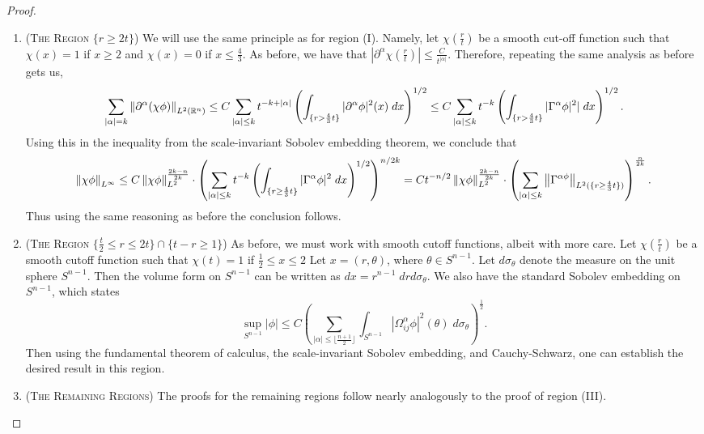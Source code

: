 \documentclass{article}
\begin{document}
\begin{proof}
\begin{enumerate}[itemsep =-2pt,label = (\Roman{*})]
		\item (\textsc{The Region $\{r \geq 2t\}$}) We will use the same principle as for region (I). Namely, let $\chi\left(\frac{r}{t}\right)$ be a smooth cut-off function such that $\chi(x) = 1$ if $x \geq 2$ and $\chi(x) = 0$ if $x \leq \frac{4}{3}$. As before, we have that $|\partial^{\alpha}\chi\left(\frac{r}{t}\right)| \leq \frac{C}{t^{|\alpha|}}$. Therefore, repeating the same analysis as before gets us, 
		\begin{equation*}
			\sum_{|\alpha| = k}\left\Vert \partial^{\alpha}(\chi\phi) \right\Vert_{L^{2}(\mathbb{R}^{n})} \leq C \sum_{|\alpha|\leq k}	t^{-k + |\alpha|}\left(\int_{\{r > \frac{4}{3}t\}}|\partial^{\alpha}\phi|^{2}(x)\;dx\right)^{1/2} \leq C\sum_{|\alpha|\leq k}t^{-k}\left(\int_{\{r > \frac{4}{3}t\}}|\Gamma^{\alpha}\phi|^{2}|\;dx\right)^{1/2}. 
		\end{equation*}
		Using this in the inequality from the scale-invariant Sobolev embedding theorem, we conclude that 
		\begin{equation*}
			\left\Vert \chi\phi \right\Vert_{L^{\infty}} \leq C \left\Vert \chi\phi \right\Vert_{L^{2}}^{\frac{2k -n}{2k}} \cdot \left(\sum_{|\alpha| \leq k}t^{-k}\left(\int_{\{r \geq  \frac{4}{3}t\}}|\Gamma^{\alpha}\phi|^{2}\;dx\right)^{1/2}\right)^{n/2k} = Ct^{-n/2}\left\Vert \chi\phi \right\Vert_{L^{2}}^{\frac{2k - n}{2k}} \cdot \left(\sum_{|\alpha|\leq k}\left\Vert \Gamma^{\alpha\phi} \right\Vert_{L^{2}(\{r \geq \frac{4}{3}t\})}\right)^{\frac{n}{2k}}. 
		\end{equation*} 
		Thus using the same reasoning as before the conclusion follows. 
		\item (\textsc{The Region $\{\frac{t}{2} \leq r \leq 2t\} \cap \{t - r \geq 1\}$}) As before, we must work with smooth cutoff functions, albeit with more care. Let $\chi\left(\frac{r}{t}\right)$ be a smooth cutoff function such that $\chi(t) = 1$ if $\frac{1}{2}\leq x \leq 2$ Let $x = (r,\theta)$, where $\theta \in S^{n-1}$. Let $d\sigma_{\theta}$ denote the measure on the unit sphere $S^{n-1}$. Then the volume form on $S^{n-1}$ can be written as $dx = r^{n-1}\;drd\sigma_{\theta}$. We also have the standard Sobolev embedding on $S^{n-1}$, which states 
		\begin{equation*}
			\sup_{S^{n-1}}|\phi|\leq C\left(\sum_{|\alpha|\leq \lfloor \frac{n + 1}{2} \rfloor}\int_{S^{n-1}}|\Omega_{ij}^{\alpha}\phi|^{2}(\theta)\;d\sigma_{\theta}\right)^{\frac{1}{2}}. 
		\end{equation*}
		Then using the fundamental theorem of calculus, the scale-invariant Sobolev embedding, and Cauchy-Schwarz, one can establish the desired result in this region. 
		\item (\textsc{The Remaining Regions}) The proofs for the remaining regions follow nearly analogously to the proof of region (III). 
	\end{enumerate}
\end{proof} 
\end{document}
